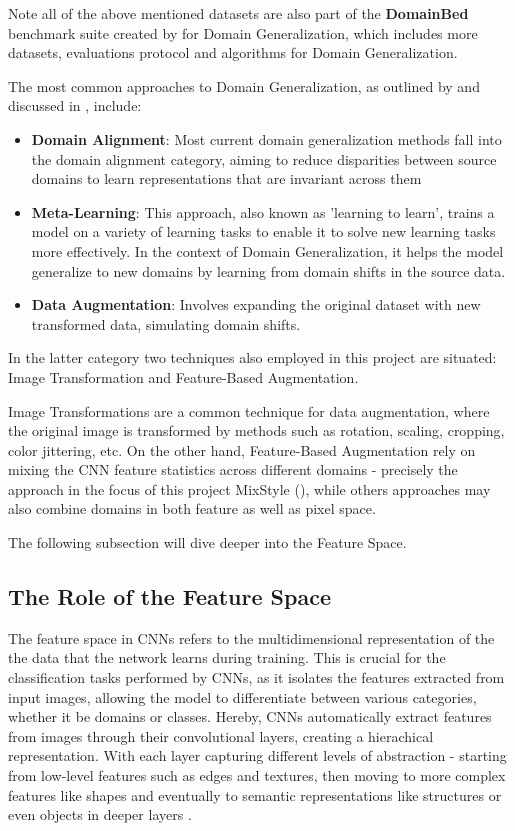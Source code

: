 Note all of the above mentioned datasets are also part of the \textbf{DomainBed} benchmark suite created by \cite{gulrajaniSearchLostDomain2020} for Domain Generalization, which includes more datasets, evaluations protocol and algorithms for Domain Generalization.

The most common approaches to Domain Generalization, as outlined by \citet{zhouDomainGeneralizationSurvey2022} and discussed in \citet{gulrajaniSearchLostDomain2020}, include:
\begin{itemize}
 \item \textbf{Domain Alignment}: Most current domain generalization methods fall into the domain alignment category, aiming to reduce disparities between source domains to learn representations that are invariant across them
 \item \textbf{Meta-Learning}: This approach, also known as 'learning to learn', trains a model on a variety of learning tasks to enable it to solve new learning tasks more effectively. In the context of Domain Generalization, it helps the model generalize to new domains by learning from domain shifts in the source data.
 \item \textbf{Data Augmentation}: Involves expanding the original dataset with new transformed data, simulating domain shifts.
\end{itemize}

In the latter category two techniques also employed in this project are situated:
Image Transformation and Feature-Based Augmentation.

Image Transformations are a common technique for data augmentation, where the original image is transformed by methods such as rotation, scaling, cropping, color jittering, etc.
On the other hand, Feature-Based Augmentation rely on mixing the CNN feature statistics across different domains - precisely the approach in the focus of this project MixStyle (\cite{zhouMixStyleNeuralNetworks2023}), while others approaches may also combine domains in both feature as well as pixel space.

The following subsection will dive deeper into the Feature Space.
\clearpage
\subsection{The Role of the Feature Space}
The feature space in CNNs refers to the multidimensional representation of the the data that the network learns during training. This is crucial for the classification tasks performed by CNNs, as it isolates the features extracted from input images, allowing the model to differentiate between various categories, whether it be domains or classes.
Hereby, CNNs automatically extract features from images through their convolutional layers, creating a hierachical representation. With each layer capturing different levels of abstraction - starting from low-level features such as edges and textures, then moving to more complex features like shapes and eventually to semantic representations like structures or even objects in deeper layers \citep{zeilerVisualizingUnderstandingConvolutional2013,Goodfellow-et-al-2016}.

